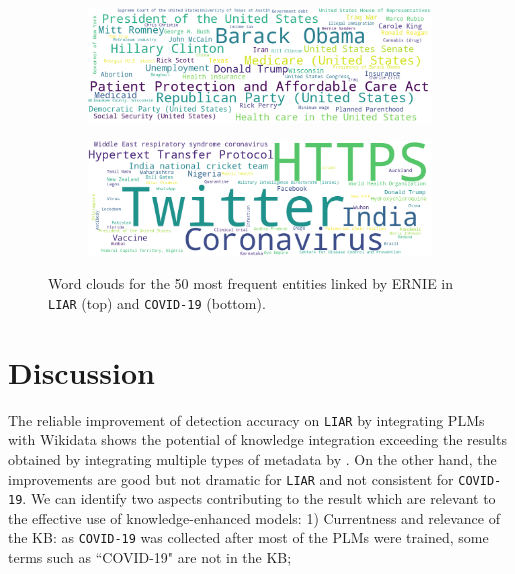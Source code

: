 \documentclass[letterpaper]{article} %
\begin{document}
\begin{figure}
\centering
\begin{subfigure}[b]{0.46\textwidth}
\centering
\includegraphics[width=\textwidth]{imgs/liar50.png}
\label{fig:e1}
\end{subfigure}
\hfill
\begin{subfigure}[b]{0.46\textwidth}

\includegraphics[width=\textwidth]{imgs/covid50.png}
\label{fig:e2}
\end{subfigure}
\caption{Word clouds for the 50 most frequent entities linked by ERNIE in  \texttt{LIAR} (top) and  \texttt{COVID-19} (bottom).}
\label{fig:word_cloud_Ernie}
\end{figure}



\section{Discussion}

The reliable improvement of detection accuracy on \texttt{LIAR} by integrating PLMs with Wikidata shows the potential of knowledge integration exceeding the results obtained by integrating multiple types of metadata by \citet{wang-2017-liar}.
On the other hand, the improvements are good but not dramatic for \texttt{LIAR} and not consistent for \texttt{COVID-19}.
We can identify two aspects contributing to the result which are relevant to the effective use of knowledge-enhanced models:  1) Currentness and relevance of the KB: as \texttt{COVID-19} was collected after most of the PLMs were trained, some terms such as ``COVID-19" are not in the KB;
\end{document}
